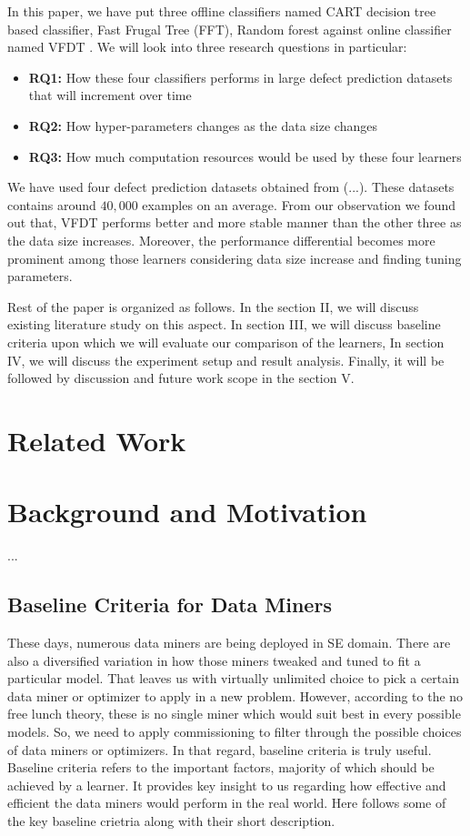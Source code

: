 \documentclass[sigplan]{acmart}\settopmatter{printfolios=true,printccs=false,printacmref=false}
\begin{document}
In this paper, we have put three offline classifiers named CART decision tree based classifier, Fast Frugal Tree (FFT), Random forest against online classifier named VFDT \cite{domingos2000mining}. We will look into three research questions in particular:
\begin{itemize}
	\item \textbf{RQ1: } How these four classifiers performs in large defect prediction datasets that will increment over time
	\item \textbf{RQ2: } How hyper-parameters changes as the data size changes
	\item \textbf{RQ3: } How much computation resources would be used by these four learners 
\end{itemize}

We have used four defect prediction datasets obtained from (...). These datasets contains around $40,000$ examples on an average. From our observation we found out that, VFDT performs better and more stable manner than the other three as the data size increases. Moreover, the performance differential becomes more prominent among those learners considering data size increase and finding tuning parameters.  

Rest of the paper is organized as follows. In the section II, we will discuss existing literature study on this aspect. In section III, we will discuss baseline criteria upon which we will evaluate our comparison of the learners, In section IV, we will discuss the experiment setup and result analysis. Finally, it will be followed by discussion and future work scope in the section V. 

\section{Related Work}
 

\section{Background and Motivation}
...
\subsection{Baseline Criteria for Data Miners} These days, numerous data miners are being deployed in SE domain. There are also a diversified variation in how those miners tweaked and tuned to fit a particular model. That leaves us with virtually unlimited choice to pick a certain data miner or optimizer to apply in a new problem. However, according to the no free lunch theory, these is no single miner which would suit best in every possible models. So, we need to apply commissioning to filter through the possible choices of data miners or optimizers. In that regard, baseline criteria is truly useful. Baseline criteria refers to the important factors, majority of which should be achieved by a learner. It provides key insight to us regarding how effective and efficient the data miners would perform in the real world. Here follows some of the key baseline crietria along with their short description. 
\end{document}
